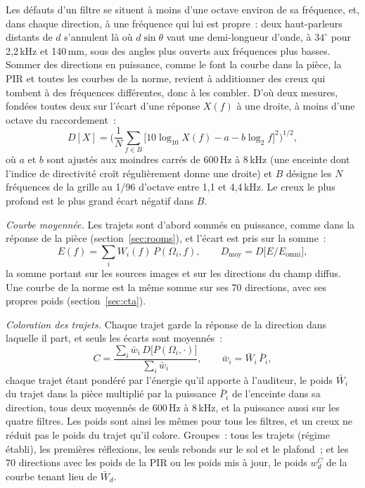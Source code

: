 \documentclass[11pt,a4paper]{article}
\begin{document}
Les défauts d'un filtre se situent à moins d'une octave environ de sa fréquence, et, dans chaque
direction, à une fréquence qui lui est propre~: deux haut-parleurs distants de $d$ s'annulent là où
$d \sin\theta$ vaut une demi-longueur d'onde, à $34^\circ$ pour 2,2\,kHz et 140\,mm, sous des angles plus
ouverts aux fréquences plus basses. Sommer des directions en puissance, comme le font la courbe dans la
pièce, la PIR et toutes les courbes de la norme, revient à additionner des creux qui tombent à des
fréquences différentes, donc à les combler. D'où deux mesures, fondées toutes deux sur l'écart d'une
réponse $X(f)$ à une droite, à moins d'une octave du raccordement~:
\begin{equation}
D[X] = \bigg(\frac{1}{N}\sum_{f \in B}\Big[10\log_{10} X(f) - a - b\log_2 f\Big]^2\bigg)^{1/2},
\end{equation}
où $a$ et $b$ sont ajustés aux moindres carrés de 600\,Hz à 8\,kHz (une enceinte dont l'indice de
directivité croît régulièrement donne une droite) et $B$ désigne les $N$ fréquences de la grille au
1/96\ieme{} d'octave entre 1,1 et 4,4\,kHz. Le creux le plus profond est le plus grand écart négatif dans
$B$.

\emph{Courbe moyennée.} Les trajets sont d'abord sommés en puissance, comme dans la réponse de la pièce
(section~\ref{sec:rooms}), et l'écart est pris sur la somme~:
\begin{equation}
E(f) = \sum_i W_i(f)\,P(\Omega_i, f), \qquad D_{\mathrm{moy}} = D\big[E / E_{\mathrm{omni}}\big],
\end{equation}
la somme portant sur les sources images et sur les directions du champ diffus. Une courbe de la norme
est la même somme sur ses 70 directions, avec ses propres poids (section~\ref{sec:cta}).

\emph{Coloration des trajets.} Chaque trajet garde la réponse de la direction dans laquelle il part, et
seuls les écarts sont moyennés~:
\begin{equation}
C = \frac{\sum_i \bar w_i\,D\big[P(\Omega_i, \cdot)\big]}{\sum_i \bar w_i}, \qquad
\bar w_i = \bar W_i\,\bar P_i,
\end{equation}
chaque trajet étant pondéré par l'énergie qu'il apporte à l'auditeur, le poids $\bar W_i$ du trajet dans
la pièce multiplié par la puissance $\bar P_i$ de l'enceinte dans sa direction, tous deux moyennés de
600\,Hz à 8\,kHz, et la puissance aussi sur les quatre filtres. Les poids sont ainsi les mêmes pour tous
les filtres, et un creux ne réduit pas le poids du trajet qu'il colore. Groupes~: tous les trajets
(régime établi), les premières réflexions, les seuls rebonds sur le sol et le plafond~; et les 70
directions avec les poids de la PIR ou les poids mis à jour, le poids $w^C_d$ de la courbe tenant lieu
de $\bar W_d$.
\end{document}
